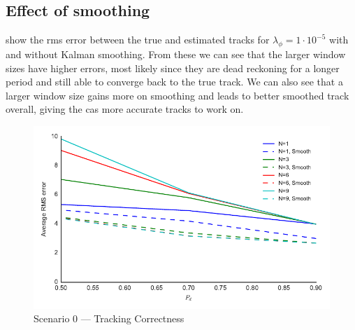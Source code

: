 \subsection{Effect of smoothing}
 show the \gls{rms} error between the true and estimated tracks for \(\lambda_\phi = 1\cdot10^{-5}\) with and without Kalman smoothing. From these we can see that the larger window sizes have higher errors, most likely since they are dead reckoning for a longer period and still able to converge back to the true track. We can also see that a larger window size gains more on smoothing and leads to better smoothed track overall,  giving the \gls{cas} more accurate tracks to work on.
\begin{figure}[H]
\centering
\includegraphics{Figures/plots/Scenario0_Tracking-TrackingCorrectness.pdf}
\caption{Scenario 0 --- Tracking Correctness}\label{fig:scenario0_tracking_correctness}
\end{figure}

